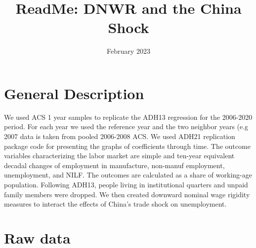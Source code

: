 \documentclass[12pt]{article}
\title{ReadMe: DNWR and the China Shock}
\date{February 2023}
\begin{document}
\maketitle


\section*{General Description} 
We used ACS 1 year samples to replicate the ADH13
regression for the 2006-2020 period. For each year we used the reference year and the two neighbor years (e.g 2007 data is taken from pooled 2006-2008 ACS. We used ADH21 replication package code for presenting the graphs of coefficients through time. The outcome variables characterizing the labor market are simple and ten-year equivalent decadal changes of employment in manufacture, non-manuf employment, unemployment, and NILF. The outcomes are calculated as a share of working-age population. Following
ADH13, people living in institutional quarters and unpaid family members were dropped. We then created downward nominal wage rigidity measures to interact the effects of China's trade shock on unemployment.

\section{Raw data} 
\end{document}
